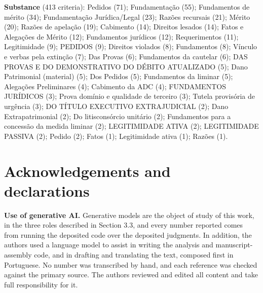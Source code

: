 \documentclass{IOS-Book-Article}
\begin{document}
\textbf{Substance} (413 criteria): Pedidos (71); Fundamentação (55); Fundamentos de mérito (34); Fundamentação Jurídica/Legal (23); Razões recursais (21); Mérito (20); Razões de apelação (19); Cabimento (14); Direitos lesados (14); Fatos e Alegações de Mérito (12); Fundamentos jurídicos (12); Requerimentos (11); Legitimidade (9); PEDIDOS (9); Direitos violados (8); Fundamentos (8); Vínculo e verbas pela extinção (7); Das Provas (6); Fundamentos da cautelar (6); DAS PROVAS E DO DEMONSTRATIVO DO DÉBITO ATUALIZADO (5); Dano Patrimonial (material) (5); Dos Pedidos (5); Fundamentos da liminar (5); Alegações Preliminares (4); Cabimento da ADC (4); FUNDAMENTOS JURÍDICOS (3); Prova domínio e qualidade de terceiro (3); Tutela provisória de urgência (3); DO TÍTULO EXECUTIVO EXTRAJUDICIAL (2); Dano Extrapatrimonial (2); Do litisconsórcio unitário (2); Fundamentos para a concessão da medida liminar (2); LEGITIMIDADE ATIVA (2); LEGITIMIDADE PASSIVA (2); Pedido (2); Fatos (1); Legitimidade ativa (1); Razões (1).

\section*{Acknowledgements and declarations}

\textbf{Use of generative AI.} Generative models are the object of study of this work, in the three roles described in Section 3.3, and every number reported comes from running the deposited code over the deposited judgments. In addition, the authors used a language model to assist in writing the analysis and manuscript-assembly code, and in drafting and translating the text, composed first in Portuguese. No number was transcribed by hand, and each reference was checked against the primary source. The authors reviewed and edited all content and take full responsibility for it.
\end{document}
